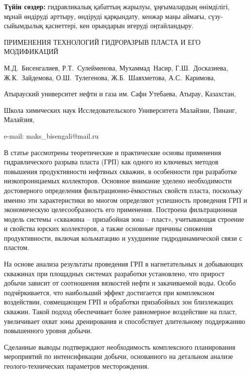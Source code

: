 {\bfseries Түйін сөздер:} гидравликалық қабаттың жарылуы, ұңғымалардың
өнімділігі, мұнай өндіруді арттыру, өндіруді қарқындату, кенжар маңы
аймағы, сүзу-сыйымдылық қасиеттері, кен орындарын игеруді оңтайландыру.

\begin{header}
ПРИМЕНЕНИЯ ТЕХНОЛОГИЙ ГИДРОРАЗРЫВ ПЛАСТА И ЕГО МОДИФИКАЦИЙ

М.Д.~Бисенгалиев\envelope,
Р.Т.~Сулейменова,
Мухаммад~Насир,
Г.Ш.~Досказиева,
Ж.К.~Зайдемова,
О.Ш.~Тулегенова,
Ж.Б.~Шаяхметова,
А.С.~Каримова,
\end{header}

\begin{affil}
Атырауский университет нефти и газа им. Сафи Утебаева, Атырау, Казахстан,

Школа химических наук Исследовательского Университета Малайзии, Пинанг, Малайзия,

e-mail: maks\_bisengali@mail.ru
\end{affil}

В статье рассмотрены теоретические и практические основы применения
гидравлического разрыва пласта (ГРП) как одного из ключевых методов
повышения продуктивности нефтяных скважин, в особенности при разработке
низкопроницаемых коллекторов. Основное внимание уделено необходимости
достоверного определения фильтрационно-ёмкостных свойств пласта,
поскольку именно эти характеристики во многом определяют успешность
проведения ГРП и экономическую целесообразность его применения.
Построена фильтрационная модель системы «скважина -- призабойная зона --
пласт», учитывающая строение и свойства юрских коллекторов, а также
основные причины снижения продуктивности, включая кольматацию и
ухудшение гидродинамической связи с пластом.

На основе анализа результаты проведения ГРП в нагнетательных и
добывающих скважинах при площадных системах разработки установлено, что
прирост добычи зависит от соотношения вязкостей нефти и закачиваемой
воды. Особо подчёркивается, что наибольший эффект достигается при
комплексном воздействии, совмещающем ГРП и обработки призабойных зон
близлежащих скважин. Такой подход обеспечивает более равномерное
воздействие на пласт, увеличивает охват зоны дренирования и способствует
длительному поддержанию повышенного уровня добычи.

Сделанные выводы подтверждают необходимость комплексного планирования
мероприятий по интенсификации добычи, основанного на детальном анализе
геолого-технических параметров месторождения.

